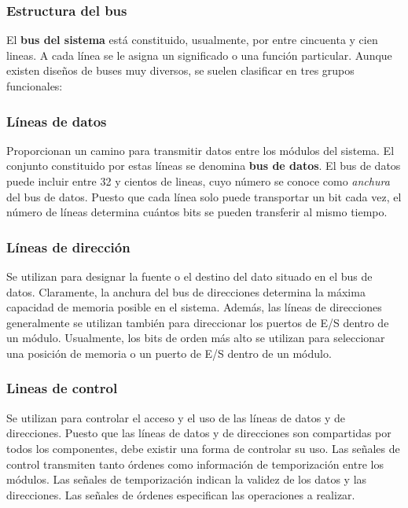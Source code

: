 \subsubsection{Estructura del bus}

El \textbf{bus del sistema} está constituido, usualmente, por entre cincuenta y cien lineas. A cada línea se le asigna un significado o una función particular. Aunque existen diseños de buses muy diversos, se suelen clasificar en tres grupos funcionales:

\subsubsection*{Líneas de datos} 

Proporcionan un camino para transmitir  datos entre los módulos del sistema. El conjunto constituido por estas líneas se denomina \textbf{bus de datos}. El bus de datos puede incluir entre 32 y cientos de lineas, cuyo número se conoce como \textit{anchura} del bus de datos. Puesto que cada línea solo puede transportar un bit cada vez, el número de líneas determina cuántos bits se pueden transferir al mismo tiempo.

\subsubsection*{Líneas de dirección}

Se utilizan para designar la fuente o el destino del dato situado en el bus de datos. Claramente, la anchura del bus de direcciones determina la máxima capacidad de memoria posible en el sistema. Además, las líneas de direcciones generalmente se utilizan también para direccionar los puertos de E/S dentro de un módulo. Usualmente, los bits de orden más alto se utilizan para seleccionar una posición de memoria o un puerto de E/S dentro de un módulo.

\subsubsection*{Lineas de control}

Se utilizan para controlar el acceso y el uso de las líneas de datos y de direcciones. Puesto que las líneas de datos y de direcciones son compartidas por todos los componentes, debe existir una forma de controlar su uso. Las señales de control transmiten tanto órdenes como información de temporización entre los módulos. Las señales de temporización indican la validez de los datos y las direcciones. Las señales de órdenes especifican las operaciones a realizar.

